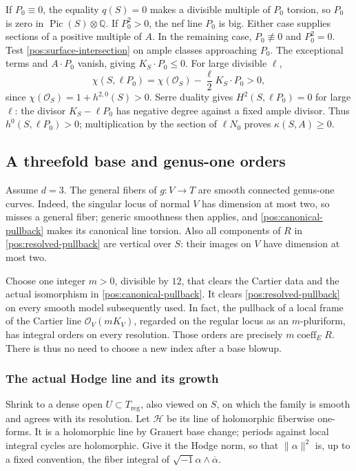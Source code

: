\documentclass[11pt,letterpaper]{article}
\theoremstyle{definition}
\theoremstyle{remark}
\begin{document}
If \(P_0\equiv0\), the equality \(q(S)=0\) makes a divisible
multiple of \(P_0\) torsion, so \(P_0\) is zero in
\(\operatorname{Pic}(S)\otimes\mathbb{Q}\). If \(P_0^2>0\), the nef line \(P_0\) is
big. Either case supplies sections of a positive multiple of \(A\).
In the remaining case, \(P_0\not\equiv0\) and \(P_0^2=0\).
Test \eqref{pos:surface-intersection} on ample classes approaching
\(P_0\). The exceptional terms and \(A\cdot P_0\) vanish, giving
\(K_S\cdot P_0\leq0\). For large divisible \(\ell\),
\begin{equation}\label{pos:surface-riemann-roch}
 \chi(S,\ell P_0)
 =\chi(\mathcal{O}_S)-\frac{\ell}{2}K_S\cdot P_0>0,
\end{equation}
since \(\chi(\mathcal{O}_S)=1+h^{2,0}(S)>0\). Serre duality gives
\(H^2(S,\ell P_0)=0\) for large \(\ell\): the divisor
\(K_S-\ell P_0\) has negative degree against a fixed ample divisor.
Thus \(h^0(S,\ell P_0)>0\); multiplication by the section of
\(\ell N_0\) proves \(\kappa(S,A)\geq0\).

\subsection{A threefold base and genus-one orders}

Assume \(d=3\). The general fibers of \(g:V\to T\) are smooth
connected genus-one curves. Indeed, the singular locus of normal
\(V\) has dimension at most two, so misses a general fiber; generic
smoothness then applies, and \eqref{pos:canonical-pullback} makes its
canonical line torsion. Also all components of \(R\) in
\eqref{pos:resolved-pullback} are vertical over \(S\): their images
on \(V\) have dimension at most two.

Choose one integer \(m>0\), divisible by \(12\), that clears the
Cartier data and the actual isomorphism in
\eqref{pos:canonical-pullback}. It clears
\eqref{pos:resolved-pullback} on every smooth model subsequently
used. In fact, the pullback of a local frame of the Cartier line
\(\mathcal{O}_V(mK_V)\), regarded on the regular locus as an
\(m\)-pluriform, has integral orders on every resolution. Those
orders are precisely \(m\operatorname{coeff}_E R\). There is thus
no need to choose a new index after a base blowup.

\subsubsection{The actual Hodge line and its growth}

Shrink to a dense open \(U\subset T_{\mathrm{reg}}\), also viewed
on \(S\), on which the family is smooth and agrees with its resolution.
Let \(\mathcal H\) be its line of holomorphic fiberwise one-forms.
It is a holomorphic line by Grauert base change; periods against local
integral cycles are holomorphic. Give it the Hodge norm, so that
\(\|\alpha\|^2\) is, up to a fixed convention, the fiber integral
of \(\sqrt{-1}\alpha\wedge\overline\alpha\).
\end{document}
